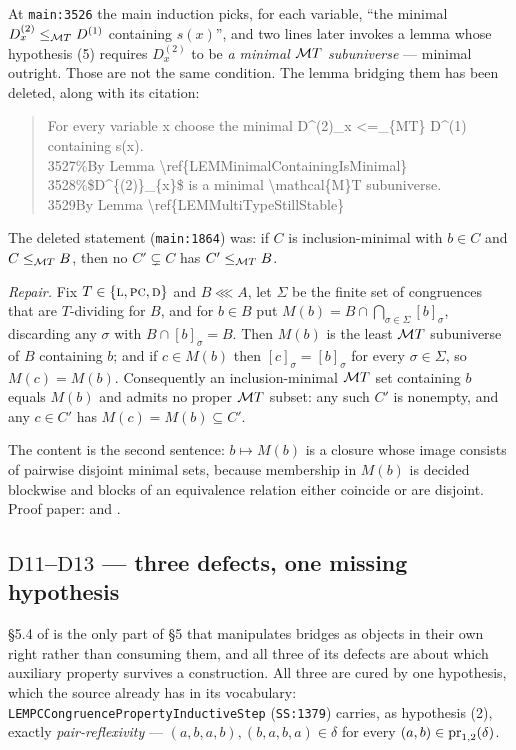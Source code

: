 At \texttt{main:3526} the main induction picks, for each variable, ``the
minimal $D^{(2)}_{x}\le_{\mathcal MT}D^{(1)}$ containing $s(x)$'', and two lines later
invokes a lemma whose hypothesis (5) requires $D^{(2)}_{x}$ to be \emph{a
minimal $\mathcal MT$ subuniverse} --- minimal outright. Those are not the same
condition. The lemma bridging them has been deleted, along with its citation:

\begin{quote}\footnotesize{}\quad For every variable x choose the minimal D\^{}(2)\_x <=\_\{MT\} D\^{}(1) containing s(x).\\
3527\quad \%By Lemma \textbackslash ref\{LEMMinimalContainingIsMinimal\}\\
3528\quad \%\$D\^{}\{(2)\}\_\{x\}\$ is a minimal \textbackslash mathcal\{M\}T subuniverse.\\
3529\quad By Lemma \textbackslash ref\{LEMMultiTypeStillStable\}
\end{quote}

The deleted statement (\texttt{main:1864}) was: if $C$ is inclusion-minimal with
$b\in C$ and $C\le_{\mathcal MT}B$, then no $C'\subsetneq C$ has $C'\le_{\mathcal MT}B$.

\emph{Repair.} Fix $T\in\{\textup{\textsc{l}},\textup{\textsc{pc}},\textup{\textsc{d}}\}$ and $B\lll A$, let $\Sigma$ be the
finite set of congruences that are $T$-dividing for $B$, and for $b\in B$ put
$M(b)=B\cap\bigcap_{\sigma\in\Sigma}[b]_{\sigma}$, discarding any $\sigma$ with
$B\cap[b]_{\sigma}=B$. Then $M(b)$ is the least $\mathcal MT$ subuniverse of $B$
containing $b$; and if $c\in M(b)$ then $[c]_{\sigma}=[b]_{\sigma}$ for every
$\sigma\in\Sigma$, so $M(c)=M(b)$. Consequently an inclusion-minimal $\mathcal MT$
set containing $b$ equals $M(b)$ and admits no proper $\mathcal MT$ subset: any such
$C'$ is nonempty, and any $c\in C'$ has $M(c)=M(b)\subseteq C'$.

The content is the second sentence: $b\mapsto M(b)$ is a closure whose image
consists of pairwise disjoint minimal sets, because membership in $M(b)$ is
decided blockwise and blocks of an equivalence relation either coincide or are
disjoint. Proof paper:  and
.

\subsection{$\mathrm D{11}$--$\mathrm D{13}$ --- three defects, one missing hypothesis}
\label{sec:D11}

\S5.4 of \cite{ZhukSimplified} is the only part of \S5 that manipulates bridges
as objects in their own right rather than consuming them, and all three of its
defects are about which auxiliary property survives a construction. All three
are cured by one hypothesis, which the source already has in its vocabulary:
\texttt{LEMPCCongruencePropertyInductiveStep} (\texttt{SS:1379}) carries, as
hypothesis (2), exactly \emph{pair-reflexivity} --- $(a,b,a,b),(b,a,b,a)\in
\delta$ for every $(a,b)\in\operatorname*{pr}_{1,2}(\delta)$.


